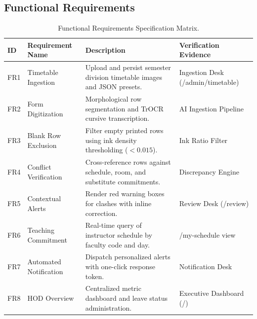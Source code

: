 \documentclass[12pt,letterpaper]{report}
\begin{document}
\subsection{Functional Requirements}
\begin{table}[htbp]
\centering
\small
\begin{tabularx}{\textwidth}{lp{3.5cm}Xp{3.2cm}}
\toprule
\textbf{ID} & \textbf{Requirement Name} & \textbf{Description} & \textbf{Verification Evidence} \\
\midrule
FR1 & Timetable Ingestion & Upload and persist semester division timetable images and JSON presets. & Ingestion Desk (/admin/timetable) \\
FR2 & Form Digitization & Morphological row segmentation and TrOCR cursive transcription. & AI Ingestion Pipeline \\
FR3 & Blank Row Exclusion & Filter empty printed rows using ink density thresholding ($< 0.015$). & Ink Ratio Filter \\
FR4 & Conflict Verification & Cross-reference rows against schedule, room, and substitute commitments. & Discrepancy Engine \\
FR5 & Contextual Alerts & Render red warning boxes for clashes with inline correction. & Review Desk (/review) \\
FR6 & Teaching Commitment & Real-time query of instructor schedule by faculty code and day. & /my-schedule view \\
FR7 & Automated Notification & Dispatch personalized alerts with one-click response token. & Notification Desk \\
FR8 & HOD Overview & Centralized metric dashboard and leave status administration. & Executive Dashboard (/) \\
\bottomrule
\end{tabularx}
\caption{Functional Requirements Specification Matrix.}
\label{tab:fr_matrix}
\end{table}
\end{document}
